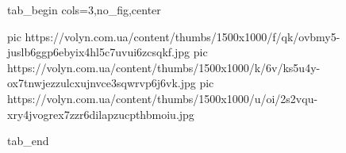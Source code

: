  
 
 
 
 


\ifcmt
  tab_begin cols=3,no_fig,center

     pic https://volyn.com.ua/content/thumbs/1500x1000/f/qk/ovbmy5-juslb6ggp6ebyix4hl5c7uvui6zcsqkf.jpg
		 pic https://volyn.com.ua/content/thumbs/1500x1000/k/6v/ks5u4y-ox7tnwjezzulcxujnvce3sqwrvp6j6vk.jpg
		 pic https://volyn.com.ua/content/thumbs/1500x1000/u/oi/2s2vqu-xry4jvogrex7zzr6dilapzucpthbmoiu.jpg

  tab_end
\fi
